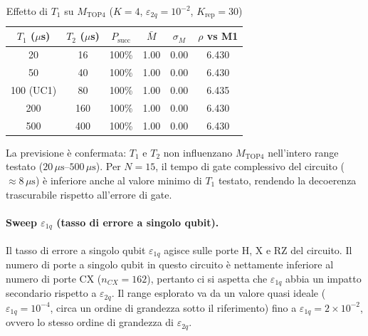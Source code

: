 \begin{onehalfspace}
\begin{table}[H]
\centering
\caption{Effetto di $T_1$ su $M_{\text{TOP4}}$ ($K=4$, $\varepsilon_{2q}=10^{-2}$, $K_{\text{rep}}=30$)}
\label{tab:sweep_t1}
\begin{tabular}{cccccc}
\hline
$T_1$ ($\mu$s) & $T_2$ ($\mu$s) & $P_{\text{succ}}$ & $\bar{M}$ & $\sigma_M$ & $\rho$ vs M1 \\
\hline
20  & 16  & 100\% & 1.00 & 0.00 & 6.430 \\
50  & 40  & 100\% & 1.00 & 0.00 & 6.430 \\
100 (UC1) & 80 & 100\% & 1.00 & 0.00 & 6.435 \\
200 & 160 & 100\% & 1.00 & 0.00 & 6.430 \\
500 & 400 & 100\% & 1.00 & 0.00 & 6.430 \\
\hline
\end{tabular}
\end{table}

La previsione è confermata: $T_1$ e $T_2$ non influenzano $M_{\text{TOP4}}$ nell'intero range testato ($20\,\mu\text{s}$--$500\,\mu\text{s}$). Per $N=15$, il tempo di gate complessivo del circuito (${\approx}8\,\mu\text{s}$) è inferiore anche al valore minimo di $T_1$ testato, rendendo la decoerenza trascurabile rispetto all'errore di gate.

\paragraph{Sweep $\varepsilon_{1q}$ (tasso di errore a singolo qubit).}
Il tasso di errore a singolo qubit $\varepsilon_{1q}$ agisce sulle porte H, X e RZ del circuito. Il numero di porte a singolo qubit in questo circuito è nettamente inferiore al numero di porte CX ($n_{CX}=162$), pertanto ci si aspetta che $\varepsilon_{1q}$ abbia un impatto secondario rispetto a $\varepsilon_{2q}$. Il range esplorato va da un valore quasi ideale ($\varepsilon_{1q}=10^{-4}$, circa un ordine di grandezza sotto il riferimento) fino a $\varepsilon_{1q}=2\times10^{-2}$, ovvero lo stesso ordine di grandezza di $\varepsilon_{2q}$.


\end{onehalfspace}
